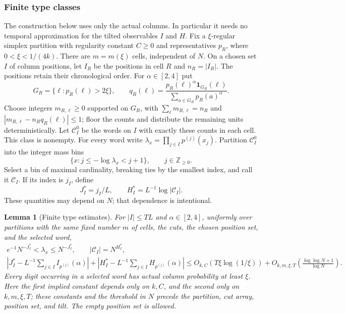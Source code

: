 \documentclass[11pt]{article}
\numberwithin{equation}{section}
\newtheorem{lemma}[theorem]{Lemma}
\theoremstyle{definition}
\theoremstyle{remark}
\newcommand{\1}{\mathbf 1}
\begin{document}
\subsubsection{Finite type classes}

The construction below uses only the actual columns.  In particular it
needs no temporal approximation for the tilted observables $I$ and $H$.
Fix a $\xi$-regular simplex partition with regularity constant $C\ge0$ and representatives
$p_R$, where $0<\xi<1/(4k)$.  There are $m=m(\xi)$ cells, independent of $N$.
On a chosen set $I$ of column positions, let $I_R$ be the positions in cell
$R$ and $n_R=|I_R|$.  The positions retain their chronological order.
For $\alpha\in[2,4]$ put
\[
 G_R=\{\ell:p_R(\ell)>2\xi\},\qquad
 q_R(\ell)=\frac{p_R(\ell)^\alpha\mathbf1_{G_R}(\ell)}
                 {\sum_{a\in G_R}p_R(a)^\alpha}.
\]
Choose integers $m_{R,\ell}\ge0$ supported on $G_R$, with
$\sum_\ell m_{R,\ell}=n_R$ and
$|m_{R,\ell}-n_Rq_R(\ell)|\le1$; floor the counts and distribute the
remaining units deterministically.  Let $\mathcal C^0_I$ be the words on
$I$ with exactly these counts in each cell.  This class is nonempty.
For every word write $\lambda_x=\prod_{j\in I}p^{(j)}(x_j)$.
Partition $\mathcal C^0_I$ into the integer mass bins
\[
 \{x:j\le-\log\lambda_x<j+1\},\qquad j\in\mathbb Z_{\ge0}.
\]
Select a bin of maximal cardinality, breaking ties by the smallest index, and
call it $\mathcal C_I$.  If its index is $j_I$, define
\[
 J_I^*=j_I/L,\qquad H_I^*=L^{-1}\log|\mathcal C_I|.
\]
These quantities may depend on $N$; that dependence is intentional.

\begin{lemma}[Finite type estimates]%
\label{lem:type-estimates}
For $|I|\le TL$ and $\alpha\in[2,4]$, uniformly over partitions with the same fixed number $m$ of cells, the cuts, the chosen
position set, and the selected word,
\begin{gather}
 e^{-1}N^{-J_I^*}<\lambda_x\le N^{-J_I^*},\qquad
 |\mathcal C_I|=N^{H_I^*},\label{eq:repair-bin-exact}\\
 \left|J_I^*-L^{-1}\sum_{j\in I}I_{p^{(j)}}(\alpha)\right|
 +\left|H_I^*-L^{-1}\sum_{j\in I}H_{p^{(j)}}(\alpha)\right|
 \le O_{k,C}(T\xi\log(1/\xi))
       +O_{k,m,\xi,T}\!\left(\frac{\log\log N+1}{\log N}\right).
 \label{eq:repair-types-error}
\end{gather}
Every digit occurring in a selected word has actual column probability
at least $\xi$.  Here the first implied constant depends only on $k,C$, and the second only on $k,m,\xi,T$; these constants and the threshold in $N$ precede the partition, cut array, position set, and tilt. The empty position set is allowed.
\end{lemma}
\end{document}
